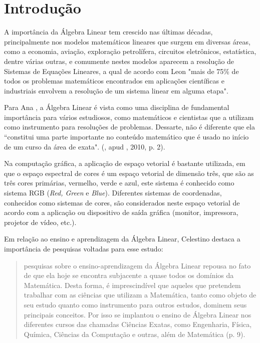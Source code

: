 \chapter{Introdução}
\label{cap:introducao}

\noindent A importância da Álgebra Linear tem crescido nas últimas décadas, principalmente nos modelos matemáticos lineares que surgem em diversas áreas, como a economia, aviação, exploração petrolífera, circuitos eletrônicos, estatística, dentre várias outras, e comumente nestes modelos aparecem a resolução de Sistemas de Equações Lineares, a qual de acordo com Leon \cite{1998:Leon} "mais de 75\% de todos os problemas matemáticos encontrados em aplicações científicas e industriais envolvem a resolução de um sistema linear em alguma etapa".  

Para Ana \cite{2010:furtado}, a Álgebra Linear é vista como uma disciplina de fundamental importância para vários estudiosos, como matemáticos e cientistas que a utilizam como instrumento para resoluções de problemas. Dessarte, não é diferente que ela ``constitui uma parte importante no conteúdo matemático que é usado no início de um curso da área de exata". (\cite{1998:dirier}, apud \cite{2010:furtado}, 2010, p. 2).

Na computação gráfica, a aplicação de espaço vetorial é bastante utilizada, em que o espaço espectral de cores é um espaço vetorial de dimensão três, que são as três cores primárias, vermelho, verde e azul, este sistema é conhecido como sistema RGB (\textit{Red, Green} e \textit{Blue}).  Diferentes sistemas de coordenadas, conhecidos como sistemas de cores, são considerados neste espaço vetorial de acordo com a aplicação ou dispositivo de saída gráfica (monitor, impressora, projetor de vídeo, etc.).

Em relação ao ensino e aprendizagem da Álgebra Linear, Celestino \cite{2000:celestino} destaca a importância de pesquisas voltadas para esse estudo:

\begin{quote}
    pesquisas sobre o ensino-aprendizagem da Álgebra Linear repousa no fato de que ela hoje se encontra subjacente a quase todos os domínios da Matemática. Desta forma, é imprescindível que aqueles que pretendem trabalhar com as ciências que utilizam a Matemática, tanto como objeto de seu estudo quanto como instrumento para outros estudos, dominem seus principais conceitos. Por isso se implantou o ensino de Álgebra Linear nos diferentes cursos das chamadas Ciências Exatas, como Engenharia, Física, Química, Ciências da Computação e outras, além de Matemática (p. 9).
\end{quote}

